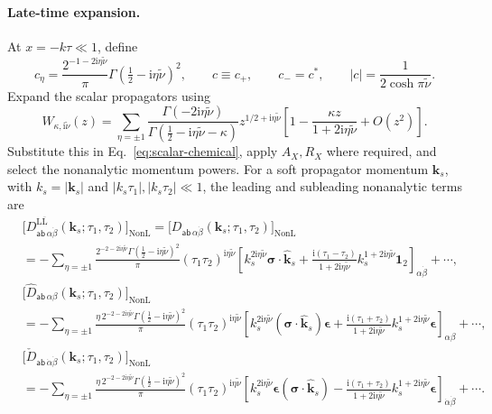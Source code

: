 \documentclass[a4paper,12pt]{article}
\newcommand{\ii}{\mathrm i}
\newcommand{\mb}{\mathbf}
\newcommand{\tn}{\tilde\nu}
\def\aa{\mathsf a}
\newcommand{\bb}{\mathsf b}
\newcommand{\NL}{\mathrm{NonL}}
\newcommand{\bk}{\mb k}
\newcommand{\bs}{\bm\sigma}
\newcommand{\one}{\mathbf1_2}
\newcommand{\epsmat}{\boldsymbol{\epsilon}}
\begin{document}
\paragraph{Late-time expansion.}
At $x=-k\tau\ll1$, define
\begin{equation}
 c_\eta=\frac{2^{-1-2\ii \eta\tn}}{\pi}
           \Gamma(\tfrac12-\ii \eta\tn)^2,\qquad
 c\equiv c_+,\qquad c_-=c^*,\qquad |c|=\frac1{2\cosh\pi\tn}.
 \label{eq:late-coefficient}
\end{equation}
Expand the scalar propagators using
\begin{equation}
 W_{\kappa,\ii\tn}(z)
 =\sum_{\eta=\pm1}
 \frac{\Gamma(-2\ii \eta\tn)}
      {\Gamma(\tfrac12-\ii \eta\tn-\kappa)}
 z^{1/2+\ii \eta\tn}
 \left[1-\frac{\kappa z}{1+2\ii \eta\tn}+O(z^2)\right].
 \label{eq:whittaker-late}
\end{equation}
Substitute this in Eq.~\eqref{eq:scalar-chemical}, apply $A_X,R_X$
where required, and select the nonanalytic momentum powers.
For a soft propagator momentum $\bk_s$, with $k_s=|\bk_s|$ and
$|k_s\tau_1|,|k_s\tau_2|\ll1$, the leading and subleading nonanalytic
terms are
\begin{align}
 &\big[D^{\mathrm L\overline{\mathrm L}}_{\aa\bb\,\alpha\dot\beta}
      (\bk_s;\tau_1,\tau_2)\big]_{\NL}
 =\big[D_{\aa\bb\,\alpha\dot\beta}(\bk_s;\tau_1,\tau_2)\big]_{\NL}
 \nonumber\\
 &=-\sum_{\eta=\pm1}
 \frac{2^{-2-2\ii \eta\tn}\Gamma(\tfrac12-\ii \eta\tn)^2}{\pi}
 (\tau_1\tau_2)^{\ii \eta\tn}
 \left[
 k_s^{2\ii \eta\tn}\bs\cdot\widehat{\bk}_s
 +\frac{\ii(\tau_1-\tau_2)}{1+2\ii \eta\tn}
 k_s^{1+2\ii \eta\tn}\one
 \right]_{\alpha\dot\beta}
 +\cdots,
 \label{eq:weyl-soft-leading}\\
 &\big[\widehat D_{\aa\bb\,\alpha\beta}(\bk_s;\tau_1,\tau_2)\big]_{\NL}
 \nonumber\\
 &=-\sum_{\eta=\pm1}
 \frac{\eta\,2^{-2-2\ii \eta\tn}\Gamma(\tfrac12-\ii \eta\tn)^2}{\pi}
 (\tau_1\tau_2)^{\ii \eta\tn}
 \left[
 k_s^{2\ii \eta\tn}(\bs\cdot\widehat{\bk}_s)\epsmat
 +\frac{\ii(\tau_1+\tau_2)}{1+2\ii \eta\tn}
 k_s^{1+2\ii \eta\tn}\epsmat
 \right]_{\alpha\beta}
 +\cdots,
 \label{eq:hat-soft-expansion}\\
 &\big[\check D_{\aa\bb\,\dot\alpha\dot\beta}(\bk_s;\tau_1,\tau_2)\big]_{\NL}
 \nonumber\\
 &=-\sum_{\eta=\pm1}
 \frac{\eta\,2^{-2-2\ii \eta\tn}\Gamma(\tfrac12-\ii \eta\tn)^2}{\pi}
 (\tau_1\tau_2)^{\ii \eta\tn}
 \left[
 k_s^{2\ii \eta\tn}\epsmat(\bs\cdot\widehat{\bk}_s)
 -\frac{\ii(\tau_1+\tau_2)}{1+2\ii \eta\tn}
 k_s^{1+2\ii \eta\tn}\epsmat
 \right]_{\dot\alpha\dot\beta}
 +\cdots.
 \label{eq:check-soft-expansion}
\end{align}
\end{document}

